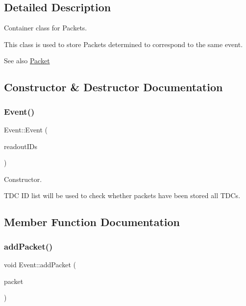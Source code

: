 \subsection{Detailed Description}
Container class for Packets. 

This class is used to store Packets determined to correspond to the same event.

\begin{DoxySeeAlso}{See also}
\hyperlink{class_packet}{Packet} 
\end{DoxySeeAlso}


\subsection{Constructor \& Destructor Documentation}
\mbox{\label{class_event_a8c190b8279bb1a30b0f42a793f5342d2}} 
\subsubsection{\texorpdfstring{Event()}{Event()}}
{\footnotesize\ttfamily Event\+::\+Event (\begin{DoxyParamCaption}\item[{const std\+::list$<$ \hyperlink{class_readout_identifier}{Readout\+Identifier} $>$ \&}]{readout\+I\+Ds }\end{DoxyParamCaption})}



Constructor. 

T\+DC ID list will be used to check whether packets have been stored all T\+D\+Cs. 

\subsection{Member Function Documentation}
\mbox{\label{class_event_a08c4689086126f702d3b14be99461c98}} 
\subsubsection{\texorpdfstring{add\+Packet()}{addPacket()}}
{\footnotesize\ttfamily void Event\+::add\+Packet (\begin{DoxyParamCaption}\item[{std\+::unique\+\_\+ptr$<$ \hyperlink{class_packet}{Packet} $>$}]{packet }\end{DoxyParamCaption})}



